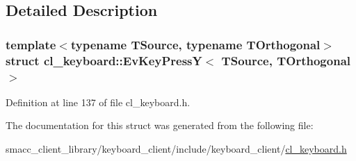 \subsection{Detailed Description}
\subsubsection*{template$<$typename T\+Source, typename T\+Orthogonal$>$\newline
struct cl\+\_\+keyboard\+::\+Ev\+Key\+Press\+Y$<$ T\+Source, T\+Orthogonal $>$}



Definition at line 137 of file cl\+\_\+keyboard.\+h.



The documentation for this struct was generated from the following file\+:\begin{DoxyCompactItemize}
\item 
smacc\+\_\+client\+\_\+library/keyboard\+\_\+client/include/keyboard\+\_\+client/\hyperlink{cl__keyboard_8h}{cl\+\_\+keyboard.\+h}\end{DoxyCompactItemize}
